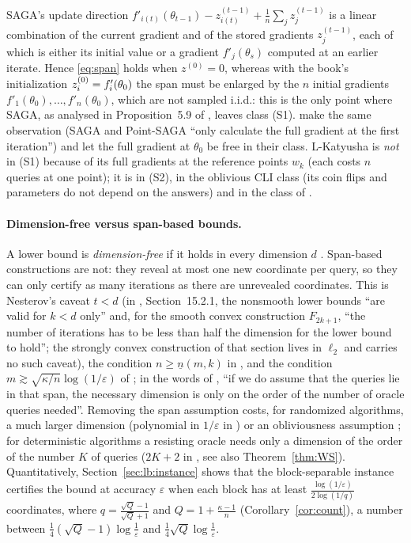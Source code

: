 SAGA's update direction $f'_{i(t)}(\theta_{t-1})-z^{(t-1)}_{i(t)}+\frac1n\sum_j z_j^{(t-1)}$ is a linear combination of the current gradient and of the stored gradients $z_j^{(t-1)}$, each of which is either its initial value or a gradient $f'_j(\theta_{s})$ computed at an earlier iterate. Hence \eqref{eq:span} holds when $z^{(0)}=0$, whereas with the book's initialization $z_i^{(0)}=f'_i(\theta_0)$ the span must be enlarged by the $n$ initial gradients $f'_1(\theta_0),\dots,f'_n(\theta_0)$, which are not sampled i.i.d.: this is the only point where SAGA, as analysed in Proposition~5.9 of \cite{bach2024learning}, leaves class (S1). \cite{han2024lower} make the same observation (SAGA and Point-SAGA ``only calculate the full gradient at the first iteration'') and let the full gradient at $\theta_0$ be free in their class. L-Katyusha \cite{kovalev2020dont} is \emph{not} in (S1) because of its full gradients at the reference points $w_k$ (each costs $n$ queries at one point); it is in (S2), in the oblivious CLI class (its coin flips and parameters do not depend on the answers) and in the class of \cite{han2024lower}.

\paragraph{Dimension-free versus span-based bounds.} A lower bound is \emph{dimension-free} if it holds in every dimension $d$ \cite{arjevani2016dimension}. Span-based constructions are not: they reveal at most one new coordinate per query, so they can only certify as many iterations as there are unrevealed coordinates. This is Nesterov's caveat $t<d$ (in \cite{bach2024learning}, Section~15.2.1, the nonsmooth lower bounds ``are valid for $k<d$ only'' and, for the smooth convex construction $F_{2k+1}$, ``the number of iterations has to be less than half the dimension for the lower bound to hold''; the strongly convex construction of that section lives in $\ell_2$ and carries no such caveat), the condition $n\ge\underline n(m,k)$ in \cite{lan2018optimal}, and the condition $m\gtrsim\sqrt{\kappa/n}\log(1/\varepsilon)$ of \cite{han2024lower}; in the words of \cite{woodworth2016tight}, ``if we do assume that the queries lie in that span, the necessary dimension is only on the order of the number of oracle queries needed''. Removing the span assumption costs, for randomized algorithms, a much larger dimension (polynomial in $1/\varepsilon$ in \cite{woodworth2016tight}) or an obliviousness assumption \cite{arjevani2016dimension}; for deterministic algorithms a resisting oracle needs only a dimension of the order of the number $K$ of queries ($2K+2$ in \cite{agarwal2015lower}, see also Theorem~\ref{thm:WS}). Quantitatively, Section~\ref{sec:lb:instance} shows that the block-separable instance certifies the bound at accuracy $\varepsilon$ when each block has at least $\frac{\log(1/\varepsilon)}{2\log(1/q)}$ coordinates, where $q=\frac{\sqrt Q-1}{\sqrt Q+1}$ and $Q=1+\frac{\kappa-1}n$ (Corollary~\ref{cor:count}), a number between $\frac14(\sqrt Q-1)\log\frac1\varepsilon$ and $\frac14\sqrt Q\log\frac1\varepsilon$.

